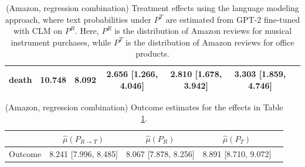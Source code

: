 \documentclass{article}
\begin{document}
\begin{table}[!ht]
\begin{tabular}{c|cccccc}
    death       &             10.748 &              8.092 & 2.656 [1.266, 4.046]             & 2.810 [1.678, 3.942] & 3.303 [1.859, 4.746]  \\
\bottomrule
\end{tabular}
\caption{(Amazon, regression combination) Treatment effects using the language modeling approach, where text probabilities under $P^T$ are estimated from GPT-2 fine-tuned with CLM on $P^R$. Here, $P^R$ is the distribution of Amazon reviews for musical instrument purchases, while $P^T$ is the distribution of Amazon reviews for office products.}
\label{tab:results_clm_gpt2_amazon_synthetic_predreg_finetuned_pr}
\end{table}

\begin{table}[!ht]
\centering
\begin{tabular}{c|cccc}
\toprule
    & $\hat{\mu}(P_{R \rightarrow T})$   & $\hat{\mu}(P_R)$     & $\hat{\mu}(P_T)$     \\
\midrule
    Outcome & 8.241 [7.996, 8.485]               & 8.067 [7.878, 8.256] & 8.891 [8.710, 9.072] \\
\bottomrule
\end{tabular}
\caption{(Amazon, regression combination) Outcome estimates for the effects in Table \ref{tab:results_clm_gpt2_amazon_synthetic_predreg_finetuned_pr}.}
\label{tab:results_clm_gpt2_amazon_synthetic_predreg_finetuned_pr_outcome}
\end{table}
\end{document}
